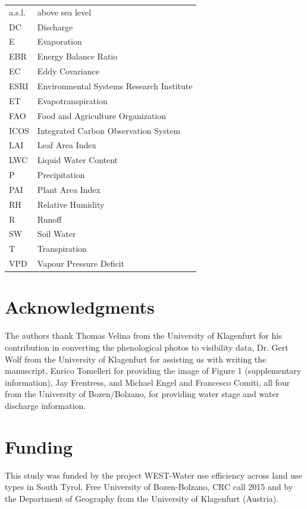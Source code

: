 \documentclass[10pt,letterpaper]{article}
\begin{document}
\begin{center}
\begin{tabular}{ | p{3cm} | p{10cm} | } 
 \hline
a.s.l. & above sea level \\
DC & Discharge \\
E & Evaporation \\
EBR & Energy Balance Ratio \\
EC & Eddy Covariance \\
ESRI & Environmental Systems Research Institute \\
ET & Evapotranspiration  \\ 
FAO & Food and Agriculture Organization \\
ICOS & Integrated Carbon Observation System \\
LAI & Leaf Area Index \\ 
LWC & Liquid Water Content \\
P & Precipitation \\
PAI & Plant Area Index \\ 
RH & Relative Humidity \\ 
R & Runoff \\
SW & Soil Water \\
T & Transpiration \\ 
VPD & Vapour Pressure Deficit \\
 \hline
\end{tabular}
\end{center}

\section*{Acknowledgments}
The authors thank Thomas Velina from the University of Klagenfurt for his contribution in converting the phenological photos to visibility data, Dr. Gert Wolf from the University of Klagenfurt for assisting us with writing the manuscript, Enrico Tomelleri for providing the image of Figure 1 (supplementary information), Jay Frentress, and Michael Engel and Francesco Comiti, all four from the University of Bozen/Bolzano, for providing water stage and water discharge information.

\section*{Funding}
This study was funded by the project WEST-Water use efficiency across land use types in South Tyrol, Free University of Bozen-Bolzano, CRC call 2015 and by the Department of Geography from the University of Klagenfurt (Austria).

\nolinenumbers

%
%
% 
\nocite*{}
\end{document}

